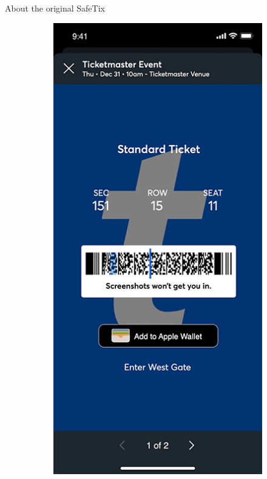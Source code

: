 \documentclass[final,dvipsnames]{beamer}
\newlength{\colwidth}
\begin{document}
\begin{frame}[t, fragile]
\begin{columns}[t]
\begin{column}{\colwidth}
\begin{block}{About the original SafeTix}
        \begin{figure}[h]
            \centering
            \begin{subfigure}{.5\textwidth}
                \centering
                \includegraphics[width=1\linewidth]{figures/SafeTix_App_Barcode.png}

\end{subfigure}
\end{figure}
\end{block}
\end{column}
\end{columns}
\end{frame}
\end{document}

